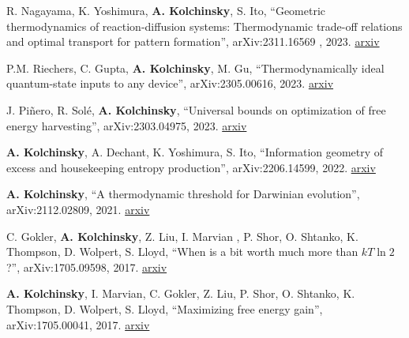 
R. Nagayama, K. Yoshimura, \textbf{A. Kolchinsky}, S. Ito, ``Geometric thermodynamics of reaction-diffusion systems: Thermodynamic trade-off relations and optimal transport for pattern formation'', arXiv:2311.16569 , 2023. \href{https://arxiv.org/abs/2311.16569}{arxiv}

P.M. Riechers, C. Gupta, \textbf{A. Kolchinsky}, M. Gu, ``Thermodynamically ideal quantum-state inputs to any device'', arXiv:2305.00616, 2023. \href{http://arxiv.org/abs/2305.00616}{arxiv}

J. Piñero, R. Solé, \textbf{A. Kolchinsky}, ``Universal bounds on optimization of free energy harvesting'', arXiv:2303.04975, 2023. \href{http://arxiv.org/abs/2303.04975}{arxiv}

\textbf{A. Kolchinsky}, A. Dechant, K. Yoshimura, S. Ito, 
``Information geometry of excess and housekeeping entropy production'', arXiv:2206.14599, 2022. \href{https://arxiv.org/abs/2206.14599}{arxiv}

\textbf{A. Kolchinsky}, ``A thermodynamic threshold for Darwinian evolution'', arXiv:2112.02809, 2021. \href{http://arxiv.org/abs/2112.02809}{arxiv} 

C. Gokler, \textbf{A. Kolchinsky}, Z. Liu, I. Marvian , P. Shor, O. Shtanko, K. Thompson, D. Wolpert, S. Lloyd, ``When is a bit worth much more than $kT \ln 2$?'', arXiv:1705.09598, 2017. \href{https://arxiv.org/abs/1705.09598}{arxiv}

\textbf{A. Kolchinsky}, I. Marvian, C. Gokler, Z. Liu, P. Shor, O. Shtanko, K. Thompson, D. Wolpert, S. Lloyd, ``Maximizing free energy gain'', arXiv:1705.00041, 2017. \href{https://arxiv.org/abs/1705.00041}{arxiv}

